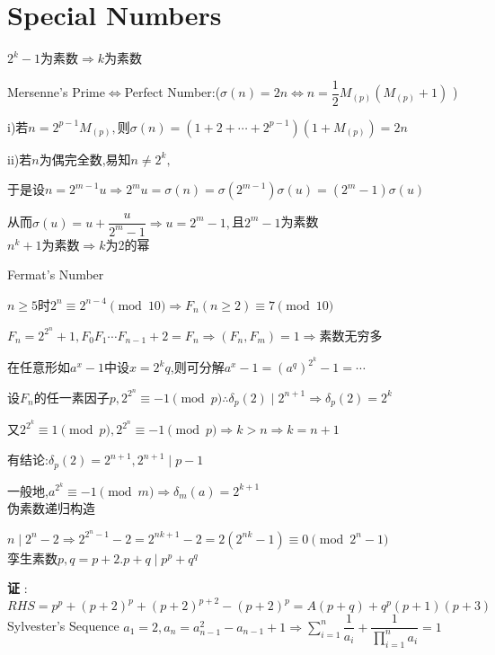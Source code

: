 
\section{Special Numbers}

$ 2^k-1$为素数$ \Rightarrow k$为素数 

Mersenne's Prime$ \Leftrightarrow $Perfect Number:($ \sigma(n)=2n \Leftrightarrow n=\dfrac{1}{2}M_{(p)}(M_{(p)}+1)$ )

i)若$ n=2^{p-1}M_{(p)},$则$ \sigma(n)=(1+2+\cdots+2^{p-1})(1+M_{(p)})=2n$

ii)若$ n$为偶完全数,易知$ n\ne 2^k,$

于是设$ n=2^{m-1}u\Rightarrow 2^mu=\sigma(n)=\sigma(2^{m-1})\sigma(u)=(2^m-1)\sigma(u)$

从而$ \sigma(u)=u+\dfrac{u}{2^m-1}\Rightarrow u=2^m-1,$且$ 2^m-1$为素数
\\

$ n^k+1$为素数$ \Rightarrow k$为2的幂

Fermat's Number

$ n\ge 5$时$ 2^n\equiv 2^{n-4} \pmod 10\Rightarrow F_n(n\ge 2)\equiv 7 \pmod 10$

$F_n=2^{2^n}+1,F_0F_1\cdots F_{n-1}+2=F_n\Rightarrow (F_n,F_m)=1 \Rightarrow $素数无穷多

在任意形如$ a^x-1$中设$ x=2^kq$,则可分解$ a^x-1=(a^q)^{2^k}-1=\cdots$

设$ F_n$的任一素因子$ p,2^{2^n}\equiv -1 \pmod p \therefore \delta_p(2)\mid 2^{n+1}\Rightarrow \delta_p(2)=2^k$

又$ 2^{2^k}\equiv 1 \pmod p,2^{2^n}\equiv -1 \pmod p\Rightarrow k>n\Rightarrow k=n+1$

有结论:$ \delta_p(2)=2^{n+1},2^{n+1}\mid p-1$

一般地,$ a^{2^k}\equiv -1 \pmod m\Rightarrow \delta_m(a)=2^{k+1}$
\\

伪素数递归构造

$ n \mid 2^n-2\Rightarrow 2^{2^n-1}-2=2^{nk+1}-2=2(2^{nk}-1)\equiv0\pmod{2^n-1}$
\\

孪生素数$ p,q=p+2.p+q\mid p^p+q^q$ 

{\bf 证 }:$RHS =p^p+(p+2)^p+(p+2)^{p+2}-(p+2)^p=A(p+q)+q^p(p+1)(p+3)$
\\

Sylvester's Sequence
$    a_1=2,a_n=a_{n-1}^2-a_{n-1}+1\Rightarrow \sum_{i=1}^{n}{\dfrac{1}{a_i}}+\dfrac{1}{\prod_{i=1}^{n}{a_i}}=1 $ 

